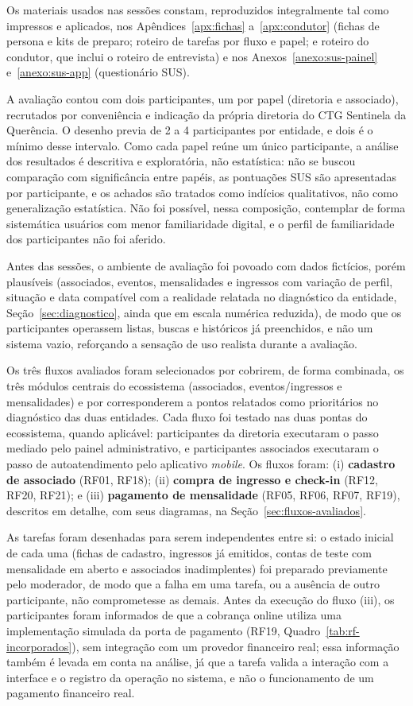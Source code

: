 \documentclass[12pt,a4paper]{article}
\begin{document}
Os materiais usados nas
sessões constam, reproduzidos integralmente tal como impressos e aplicados, nos Apêndices~\ref{apx:fichas}
a~\ref{apx:condutor} (fichas de persona e kits de preparo; roteiro de tarefas por fluxo e papel; e
roteiro do condutor, que inclui o roteiro de entrevista) e nos Anexos~\ref{anexo:sus-painel}
e~\ref{anexo:sus-app} (questionário SUS).

A avaliação contou com dois participantes, um por papel (diretoria e associado), recrutados por
conveniência e indicação da própria diretoria do CTG Sentinela da Querência. O desenho previa de 2 a 4
participantes por entidade, e dois é o mínimo desse intervalo. Como cada papel reúne um único
participante, a análise dos resultados é descritiva e exploratória, não estatística: não se buscou
comparação com significância entre papéis, as pontuações SUS são apresentadas por participante, e os
achados são tratados como indícios qualitativos, não como generalização estatística. Não foi
possível, nessa composição, contemplar de forma sistemática usuários com menor familiaridade digital,
e o perfil de familiaridade dos participantes não foi aferido.

Antes das sessões, o ambiente de avaliação foi povoado com dados fictícios, porém
plausíveis (associados, eventos, mensalidades e ingressos com variação de perfil, situação e data
compatível com a realidade relatada no diagnóstico da entidade, Seção~\ref{sec:diagnostico},
ainda que em escala numérica reduzida), de modo que os participantes operassem listas, buscas e
históricos já preenchidos, e não um sistema vazio, reforçando a sensação de uso realista durante a
avaliação.

Os três fluxos avaliados foram selecionados por cobrirem, de forma combinada, os três módulos
centrais do ecossistema (associados, eventos/ingressos e mensalidades) e por corresponderem a pontos
relatados como prioritários no diagnóstico das duas entidades. Cada fluxo foi testado nas duas
pontas do ecossistema, quando aplicável: participantes da diretoria executaram o passo mediado pelo
painel administrativo, e participantes associados executaram o passo de autoatendimento pelo
aplicativo \textit{mobile}. Os fluxos foram: (i) \textbf{cadastro de associado} (RF01, RF18);
(ii) \textbf{compra de ingresso e check-in} (RF12, RF20, RF21); e (iii) \textbf{pagamento de
mensalidade} (RF05, RF06, RF07, RF19), descritos em detalhe, com seus diagramas, na
Seção~\ref{sec:fluxos-avaliados}.

As tarefas foram desenhadas para serem independentes entre si: o estado inicial de cada uma (fichas
de cadastro, ingressos já emitidos, contas de teste com mensalidade em aberto e associados
inadimplentes) foi preparado previamente pelo moderador, de modo que a falha em uma tarefa, ou a
ausência de outro participante, não comprometesse as demais. Antes da execução do
fluxo (iii), os participantes foram informados de que a cobrança online utiliza uma implementação
simulada da porta de pagamento (RF19, Quadro~\ref{tab:rf-incorporados}), sem integração com um
provedor financeiro real; essa informação também é levada em conta na análise, já que a tarefa valida
a interação com a interface e o registro da operação no sistema, e não o funcionamento de um
pagamento financeiro real.
\end{document}
